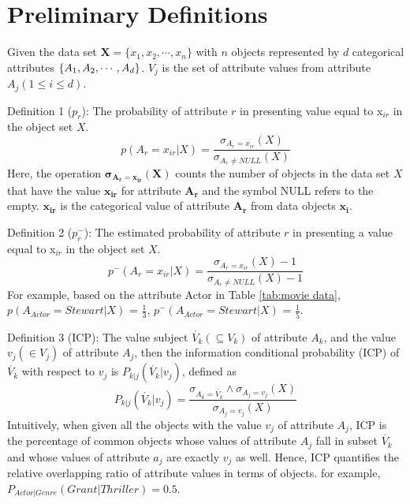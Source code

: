 \documentclass[review]{elsarticle}
\begin{document}
\section{Preliminary Definitions}
Given the data set $\mathbf{X} = \{x_1,x_2,\cdots,x_n\}$ with $n$ objects represented by $d$ categorical attributes $\mathbf\{A_1,A_2,\cdots,A_d\}$. $V_j$ is the set of attribute values from attribute $A_j (1 \leq i \leq d)$.

Definition 1 ($p_r$): The probability of attribute $r$ in presenting value equal to x$_{ir}$ in the object set $X$.
\begin{equation}
p(A_r = x_{ir}|X) = \frac{\sigma_{A_r = x_{ir}}(X)}{\sigma_{A_r \neq NULL}(X)}
\label{equ1}
\end{equation}
Here, the operation $\mathbf{\sigma_{A_r = x_{ir}}(X)}$ counts the number of objects in the data set $X$ that have the value $\mathbf{x_{ir}}$ for attribute $\mathbf{A_{r}}$ and the symbol NULL refers to the empty. $\mathbf{x_{ir}}$ is the categorical value of attribute $\mathbf{A_{r}}$ from data objects $\mathbf{x_{i}}$.

Definition 2 ($p_r^-$): The estimated probability of attribute $r$ in presenting a value equal to x$_{ir}$ in the object set $X$.
\begin{equation}
p^-(A_r = x_{ir}|X) = \frac{\sigma_{A_r = x_{ir}}(X) - 1}{\sigma_{A_r \neq NULL}(X) - 1}
\label{equ2}
\end{equation}
For example, based on the attribute Actor in Table \ref{tab:movie data}, $p(A_{Actor} = Stewart|X)$ = $\frac{1}{3}$,  $p^-(A_{Actor} = Stewart|X)$ = $\frac{1}{5}$.

Definition 3 (ICP): The value subject $\acute{V_k} (\subseteq V_k)$ of attribute $A_k$, and the value $v_j (\in V_j)$ of attribute $A_j$, then the information conditional probability (ICP) of $\acute{V_k}$ with respect to $v_j$ is $P_{k|j}(\acute{V_k} | v_j)$, defined as
\begin{equation}
P_{k|j}(\acute{V_k} | v_j) = \frac{\sigma_{A_k = \acute{V_k}} \wedge \sigma_{A_j = v_j}(X)}{\sigma_{A_j = v_j}(X)}
\label{equ3}
\end{equation}
Intuitively, when given all the objects with the value $v_j$ of attribute $A_j$, ICP is the percentage of common objects whose values of attribute $A_j$ fall in subset $\acute{V_k}$ and whose values of attribute $a_j$ are exactly $v_j$ as well. Hence, ICP quantifies the relative overlapping ratio of attribute values in terms of objects. for example, $P_{Actor|Genre}(Grant | Thriller) = 0.5$.
\end{document}
